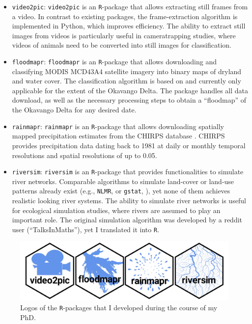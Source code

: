 \documentclass[../FinalThesis.tex]{subfiles}
\begin{document}
\begin{itemize}

  \item \texttt{video2pic}: \texttt{video2pic} is an \texttt{R}-package that
  allows extracting still frames from a video. In contrast to existing packages,
  the frame-extraction algorithm is implemented in Python, which improves
  efficiency. The ability to extract still images from videos is particularly
  useful in cameratrapping studies, where videos of animals need to be converted
  into still images for classification.

  \item \texttt{floodmapr}: \texttt{floodmapr} is an \texttt{R}-package that
  allows downloading and classifying MODIS MCD43A4 satellite imagery into binary
  maps of dryland and water cover. The classification algorithm is based on
  \citet{Wolski.2017} and currently only applicable for the extent of the
  Okavango Delta. The package handles all data download, as well as the
  necessary processing steps to obtain a ``floodmap'' of the Okavango Delta for
  any desired date.

  \item \texttt{rainmapr}: \texttt{rainmapr} is an \texttt{R}-package that
  allows downloading spatially mapped precipitation estimates from the CHIRPS
  database \citep{Funk.2015}. CHIRPS provides precipitation data dating back to
  1981 at daily or monthly temporal resolutions and spatial resolutions of up to
  0.05\degree.

  \item \texttt{riversim}: \texttt{riversim} is an \texttt{R}-package that
  provides functionalities to simulate river networks. Comparable algorithms to
  simulate land-cover or land-use patterns already exist (e.g., \texttt{NLMR},
  \citealp{Sciaini.2018} or \texttt{gstat}, \citealp{Pebesma.2004}), yet none of
  them achieves realistic looking river systems. The ability to simulate river
  networks is useful for ecological simulation studies, where rivers are assumed
  to play an important role. The original simulation algorithm was developed by
  a reddit user (``TalksInMaths''), yet I translated it into \texttt{R}.

\end{itemize}

\begin{figure}[htpb]
\begin{center}
  \includegraphics[width = \textwidth]{Figures/Packages}
  \caption{Logos of the \texttt{R}-packages that I developed during the course
  of my PhD.}
  \label{Packages}
\end{center}
\end{figure}

\end{document}
